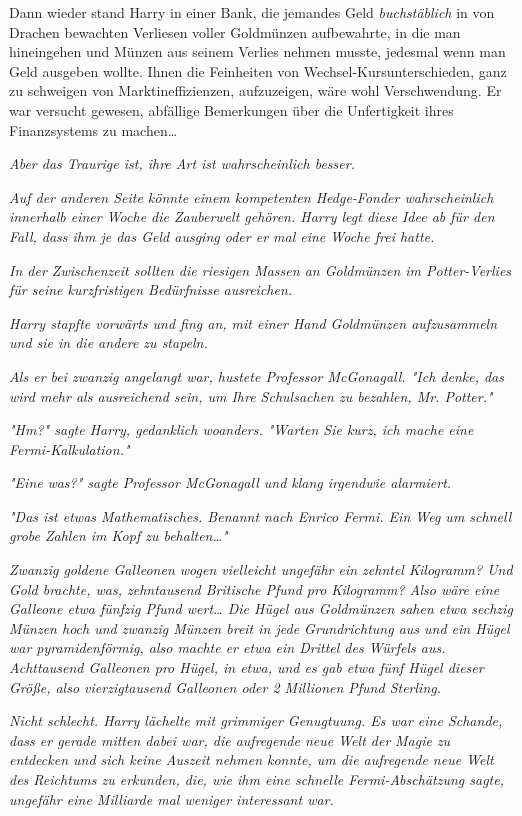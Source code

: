 {Dann wieder stand Harry in einer Bank, die jemandes Geld \emph{buchstäblich} in von Drachen bewachten Verliesen voller Goldmünzen aufbewahrte, in die man hineingehen und Münzen aus seinem Verlies nehmen musste, jedesmal wenn man Geld ausgeben wollte. Ihnen die Feinheiten von Wechsel-Kursunterschieden, ganz zu schweigen von Marktineffizienzen, aufzuzeigen, wäre wohl Verschwendung. Er war versucht gewesen, abfällige Bemerkungen über die Unfertigkeit ihres Finanzsystems zu machen…

\emph{Aber das Traurige ist, ihre Art ist wahrscheinlich besser.}

\emph{Auf der anderen Seite könnte einem kompetenten Hedge-Fonder wahrscheinlich innerhalb einer Woche die Zauberwelt gehören. Harry legt diese Idee ab für den Fall, dass ihm je das Geld ausging oder er mal eine Woche frei hatte.}

\emph{In der Zwischenzeit sollten die riesigen Massen an Goldmünzen im Potter-Verlies für seine kurzfristigen Bedürfnisse ausreichen.}

\emph{Harry stapfte vorwärts und fing an, mit einer Hand Goldmünzen aufzusammeln und sie in die andere zu stapeln.}

\emph{Als er bei zwanzig angelangt war, hustete Professor McGonagall. "Ich denke, das wird mehr als ausreichend sein, um Ihre Schulsachen zu bezahlen, Mr. Potter."}

\emph{"Hm?" sagte Harry, gedanklich woanders. "Warten Sie kurz, ich mache eine Fermi-Kalkulation."}

\emph{"Eine} \emph{\emph{was?}" sagte Professor McGonagall und klang irgendwie alarmiert.}

\emph{"Das ist etwas Mathematisches. Benannt nach Enrico Fermi. Ein Weg um schnell grobe Zahlen im Kopf zu behalten…"}

\emph{Zwanzig goldene Galleonen wogen vielleicht ungefähr ein zehntel Kilogramm? Und Gold brachte, was, zehntausend Britische Pfund pro Kilogramm? Also wäre eine Galleone etwa fünfzig Pfund wert… Die Hügel aus Goldmünzen sahen etwa sechzig Münzen hoch und zwanzig Münzen breit in jede Grundrichtung aus und ein Hügel war pyramidenförmig, also machte er etwa ein Drittel des Würfels aus. Achttausend Galleonen pro Hügel, in etwa, und es gab etwa fünf Hügel dieser Größe, also vierzigtausend Galleonen oder 2 Millionen Pfund Sterling.}

\emph{Nicht schlecht. Harry lächelte mit grimmiger Genugtuung. Es war eine Schande, dass er gerade mitten dabei war, die aufregende neue Welt der} \emph{Magie zu entdecken und sich keine Auszeit nehmen konnte, um die aufregende neue Welt des Reichtums zu erkunden, die, wie ihm eine schnelle Fermi-Abschätzung sagte, ungefähr eine Milliarde mal weniger interessant war.}

}
